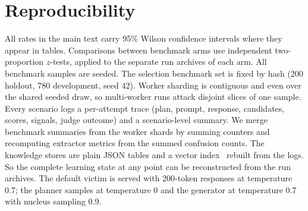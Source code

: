 \documentclass[conference]{IEEEtran}
\begin{document}
\section{Reproducibility}
All rates in the main text carry 95\% Wilson confidence intervals where they appear in tables. Comparisons between benchmark arms use independent two-proportion $z$-tests, applied to the separate run archives of each arm. All benchmark samples are seeded. The selection benchmark set is fixed by hash (200 holdout, 780 development, seed 42). Worker sharding is contiguous and even over the shared seeded draw, so multi-worker runs attack disjoint slices of one sample. Every scenario logs a per-attempt trace (plan, prompt, response, candidates, scores, signals, judge outcome) and a scenario-level summary. We merge benchmark summaries from the worker shards by summing counters and recomputing extractor metrics from the summed confusion counts. The knowledge stores are plain JSON tables and a vector index~\cite{johnson2019} rebuilt from the logs. So the complete learning state at any point can be reconstructed from the run archives. The default victim is served with 200-token responses at temperature 0.7; the planner samples at temperature 0 and the generator at temperature 0.7 with nucleus sampling 0.9.
\end{document}
